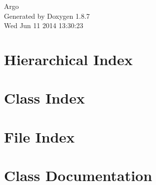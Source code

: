 \documentclass[twoside]{book}
\newcommand{\+}{\discretionary{\mbox{\scriptsize$\hookleftarrow$}}{}{}}
\newcommand{\clearemptydoublepage}{%
  \newpage{\pagestyle{empty}\cleardoublepage}%
}
\begin{document}
\hypersetup{pageanchor=false,
             bookmarks=true,
             bookmarksnumbered=true,
             pdfencoding=unicode
            }
\begin{titlepage}
\vspace*{7cm}
\begin{center}%
{\Large Argo }\\
\vspace*{1cm}
{\large Generated by Doxygen 1.8.7}\\
\vspace*{0.5cm}
{\small Wed Jun 11 2014 13:30:23}\\
\end{center}
\end{titlepage}
\clearemptydoublepage
\tableofcontents
\clearemptydoublepage
{}
\hypersetup{pageanchor=true}

\chapter{Hierarchical Index}

\chapter{Class Index}

\chapter{File Index}

\chapter{Class Documentation}







\end{document}
